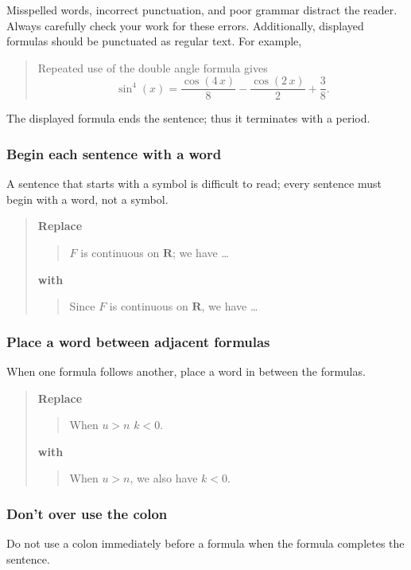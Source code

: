 \documentclass[12pt,fleqn]{article}
\newcounter{ex}\setcounter{ex}{0}
\newcounter{se}\setcounter{se}{0}
\begin{document}
Misspelled words, incorrect punctuation, and poor grammar distract the reader.  
Always carefully check your work for these errors. Additionally, 
displayed formulas should be punctuated as regular text.  For example,
\begin{quote}
Repeated use of the  double angle formula gives
\[
   \sin^4(x) = \frac {\cos \left(4\,x\right)}{8}-\frac {\cos \left(2\,x\right)}{2%
 }+\frac {3}{8}. 
\]
\end{quote}
The displayed formula ends the sentence; thus it terminates with a period.

 \subsubsection{  Begin each sentence with a word}  


A sentence that starts with a symbol is difficult to 
read; every sentence must begin with a word, not a symbol.

\begin{quote}
\textbf{\textbf{Replace}}
\begin{quote}
$F$ is continuous on $\mathbf{R}$; we have \dots
\end{quote}
\textbf{with}
\begin{quote}
Since $F$ is continuous on $\mathbf{R}$, we have \dots
\end{quote}
\end{quote}

 \subsubsection{ Place a word between adjacent formulas}

When one formula follows another, place a word in between the formulas.

\begin{quote}
\textbf{\textbf{Replace}}
\begin{quote}
   When \(u > n\)  \(k < 0\).
\end{quote}
\textbf{with}
\begin{quote}
  When \(u > n\), we also have \(k < 0\).
\end{quote}
\end{quote}

 \subsubsection{ Don't over use the colon}

Do not use a colon immediately before a formula when the formula 
completes the sentence.
\end{document}
